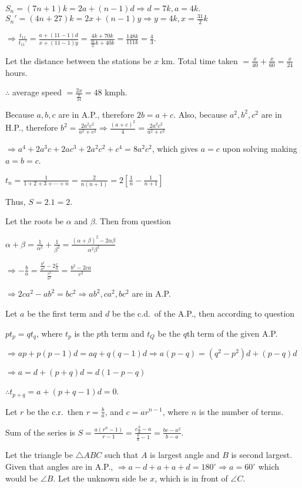  $S_n = (7n + 1)k = 2a + (n - 1)d \Rightarrow d = 7k, a = 4k$. $S_n' = (4n + 27)k = 2x + (n -
  1)y\Rightarrow y = 4k, x = \frac{31}{2}k$

  $\Rightarrow \frac{t_{11}}{t_{11}'} = \frac{a + (11 - 1)d}{x + (11 - 1)y} = \frac{4k + 70k}{\frac{31}{2}k +
    40k} = \frac{148k}{111k} = \frac{4}{3}$.
\item Let the distance between the stations be $x$ km. Total time taken $= \frac{x}{40} + \frac{x}{60}
  = \frac{x}{24}$ hours.

  $\therefore$ average speed $= \frac{2x}{\frac{x}{24}} = 48$ kmph.
\item Because $a, b, c$ are in A.P., therefore $2b = a + c$. Also, because $a^2, b^2, c^2$ are in H.P.,
  therefore $b^2 = \frac{2a^2c^2}{a^2 + c^2} \Rightarrow \frac{(a + c)^2}{4} = \frac{2a^2c^2}{a^2 + c^2}$

  $\Rightarrow a^4 + 2a^3c + 2ac^3 + 2a^2c^2 + c^4 = 8a^2c^2$, which gives $a = c$ upon solving making $a =
  b = c$.
\item $t_n = \frac{1}{1 + 2 + 3 + \cdots + n} = \frac{2}{n(n + 1)} = 2\left[\frac{1}{n} - \frac{1}{n +
    1}\right]$

  Thus, $S = 2.1 = 2$.
\item Let the roots be $\alpha$ and $\beta$. Then from question

  $\alpha + \beta = \frac{1}{\alpha^2} + \frac{1}{\beta^2} = \frac{(\alpha + \beta)^2 -
  2\alpha\beta}{\alpha^2\beta^2}$

  $\Rightarrow -\frac{b}{a} = \frac{\frac{b^2}{a^2} - 2\frac{c}{a}}{\frac{c^2}{a^2}} = \frac{b^2 -
  2ca}{c^2}$

  $\Rightarrow 2ca^2 - ab^2 = bc^2\Rightarrow ab^2, ca^2, bc^2$ are in A.P.
\item Let $a$ be the first term and $d$ be the c.d.\ of the A.P., then according to question

  $pt_p = qt_q$, where $t_p$ is the $p$th term and $t_Q$ be the $q$th term of the given A.P.

  $\Rightarrow ap + p(p - 1)d = aq + q(q - 1)d \Rightarrow a(p - q) = (q^2 - p^2)d + (p - q)d$

  $\Rightarrow a = d +(p + q)d = d(1 - p - q)$

  $\therefore t_{p + q} = a + (p + q - 1)d = 0$.
\item Let $r$ be the c.r.\ then $r = \frac{b}{a}$, and $c = ar^{n - 1}$, where $n$ is the number of terms.

  Sum of the series is $S = \frac{a(r^n - 1)}{r - 1} = \frac{c\frac{b}{a} - a}{\frac{b}{a} - 1} = \frac{bc -
    a^2}{b - a}$.
\item Let the triangle be $\triangle ABC$ such that $A$ is largest angle and $B$ is second largest. Given
  that angles are in A.P., $\Rightarrow a -d + a + a + d = 180^\circ \Rightarrow a = 60^\circ$ which would
  be $\angle B$. Let the unknown side be $x$, which is in front of $\angle C$.


